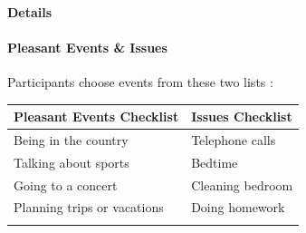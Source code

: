 \documentclass[]{book}
\let\oldparagraph\paragraph
\renewcommand{\paragraph}[1]{\oldparagraph{#1}\mbox{}}
\begin{document}
\hypertarget{details}{%
\paragraph{Details}\label{details}}

\hypertarget{pleasant-events-issues}{%
\paragraph{Pleasant Events \& Issues}\label{pleasant-events-issues}}

Participants choose events from these two lists \citep{macphillamy_1982}:

\begin{longtable}[]{@{}ll@{}}
\toprule
\begin{minipage}[b]{0.50\columnwidth}\raggedright
Pleasant Events Checklist\strut
\end{minipage} & \begin{minipage}[b]{0.44\columnwidth}\raggedright
Issues Checklist\strut
\end{minipage}\tabularnewline
\midrule
\endhead
\begin{minipage}[t]{0.50\columnwidth}\raggedright
Being in the country\strut
\end{minipage} & \begin{minipage}[t]{0.44\columnwidth}\raggedright
Telephone calls\strut
\end{minipage}\tabularnewline
\begin{minipage}[t]{0.50\columnwidth}\raggedright
Talking about sports\strut
\end{minipage} & \begin{minipage}[t]{0.44\columnwidth}\raggedright
Bedtime\strut
\end{minipage}\tabularnewline
\begin{minipage}[t]{0.50\columnwidth}\raggedright
Going to a concert\strut
\end{minipage} & \begin{minipage}[t]{0.44\columnwidth}\raggedright
Cleaning bedroom\strut
\end{minipage}\tabularnewline
\begin{minipage}[t]{0.50\columnwidth}\raggedright
Planning trips or vacations\strut
\end{minipage} & \begin{minipage}[t]{0.44\columnwidth}\raggedright
Doing homework\strut
\end{minipage}\tabularnewline
\begin{minipage}[t]{0.50\columnwidth}\raggedright

\end{minipage}
\end{longtable}
\end{document}
